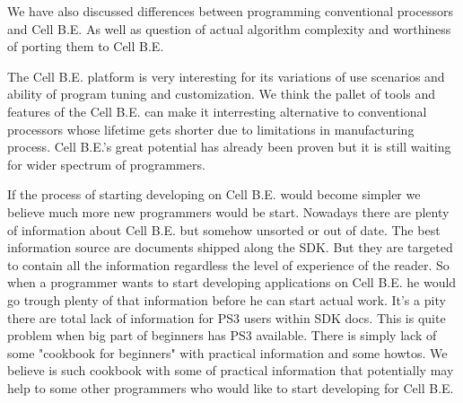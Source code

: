\par
We have also discussed differences between programming conventional processors and Cell B.E.
As well as question of actual algorithm complexity and worthiness of porting them to Cell B.E.


\par
The Cell B.E. platform is very interesting for its variations of use scenarios and ability of program tuning and customization.
We think the pallet of tools and features of the Cell B.E. can make it interresting alternative to conventional processors whose lifetime gets shorter due to limitations in manufacturing process.
Cell B.E.'s great potential has already been proven but it is still waiting for wider spectrum of programmers.

\par
If the process of starting developing on Cell B.E. would become simpler we believe much more new programmers would be start.
Nowadays there are plenty of information about Cell B.E. but somehow unsorted or out of date.
The best information source are documents shipped along the SDK.
But they are targeted to contain all the information regardless the level of experience of the reader.
So when a programmer wants to start developing applications on Cell B.E. he would go trough plenty of that information before he can start actual work.
It's a pity there are total lack of information for PS3 users within SDK docs.
This is quite problem when big part of beginners has PS3 available.
There is simply lack of some "cookbook for beginners" with practical information and some howtos.
We believe is such cookbook with some of practical information that potentially may help to some other programmers who would like to start developing for Cell B.E.
